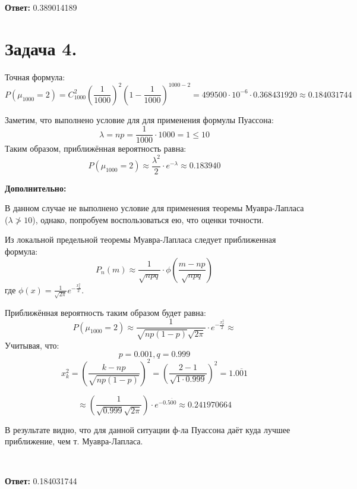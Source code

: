 \noindent \textbf{Ответ:} 0.389014189

\section*{Задача 4.}

Точная формула:
\[ P(\mu_{1000} = 2) = C_{1000}^{2} \left(\frac{1}{1000}\right)^{2} \left( 1 - \frac{1}{1000} \right)^{1000-2} = 499500 \cdot 10^{-6} \cdot 0.368431920 \approx 0.184031744 \]

Заметим, что выполнено условие для для применения формулы Пуассона:
\[ \lambda = np = \frac{1}{1000} \cdot 1000 = 1 \le 10 \]
Таким образом, приближённая вероятность равна:
\[ P(\mu_{1000}=2) \approx \frac{\lambda^{2}}{2} \cdot e^{-\lambda} \approx 0.183940 \]

\textbf{Дополнительно:}

В данном случае не выполнено условие для применения теоремы Муавра-Лапласа ($\lambda \not > 10$), однако, попробуем воспользоваться ею, что оценки точности.

Из локальной предельной теоремы Муавра-Лапласа следует приближенная формула:
\[ P_n(m) \approx \frac{1}{\sqrt{npq}} \cdot \phi \left( \frac{m - np}{\sqrt{npq}} \right) \]
где $\phi(x) = \frac{1}{\sqrt{2 \pi}} e^{-\frac{x_k^2}{2}}$.

Приближённая вероятность таким образом будет равна:
\[ P(\mu_{1000} = 2) \approx \frac{1}{\sqrt{np(1-p)}\sqrt{2 \pi}} \cdot e^{-\frac{x_k^2}{2}} \approx \]
Учитывая, что:
\[ p = 0.001, q = 0.999 \]
\[ x_k^2 = \left( \frac{k-np}{\sqrt{np(1-p)}} \right)^2 = \left( \frac{2 - 1}{\sqrt{1 \cdot 0.999}} \right)^2 = 1.\overline{001} \]

\[ \approx \left( \frac{1}{\sqrt{0.999} \sqrt{2 \pi}} \right) \cdot e^{-0.\overline{500}} \approx 0.241970664 \]

В результате видно, что для данной ситуации ф-ла Пуассона даёт куда лучшее приближение, чем т. Муавра-Лапласа.

~

\noindent \textbf{Ответ:} 0.184031744

 